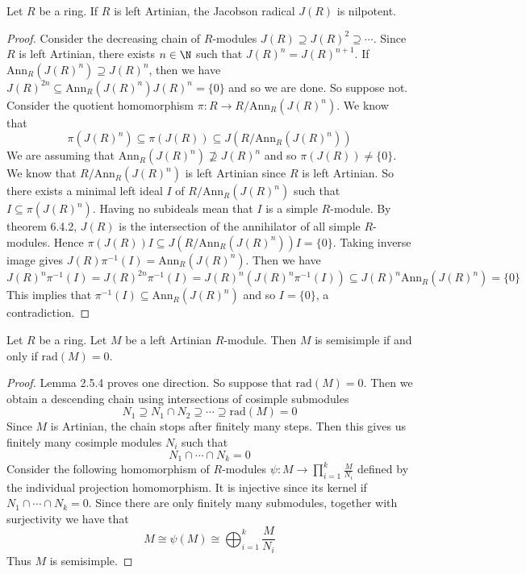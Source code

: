 \documentclass[a4paper]{article}
\begin{document}
\begin{prp}{}{} Let $R$ be a ring. If $R$ is left Artinian, the Jacobson radical $J(R)$ is nilpotent. 
\begin{proof}
Consider the decreasing chain of $R$-modules $J(R)\supseteq J(R)^2\supseteq\cdots$. Since $R$ is left Artinian, there exists $n\in\N$ such that $J(R)^n=J(R)^{n+1}$. If $\text{Ann}_R(J(R)^n)\supseteq J(R)^n$, then we have $J(R)^{2n}\subseteq\text{Ann}_R(J(R)^n)J(R)^n=\{0\}$ and so we are done. So suppose not. Consider the quotient homomorphism $\pi:R\to R/\text{Ann}_R(J(R)^n)$. We know that $$\pi(J(R)^n)\subseteq\pi(J(R))\subseteq J(R/\text{Ann}_R(J(R)^n))$$ We are assuming that $\text{Ann}_R(J(R)^n)\not\supseteq J(R)^n$ and so $\pi(J(R))\neq\{0\}$. We know that $R/\text{Ann}_R(J(R)^n)$ is left Artinian since $R$ is left Artinian. So there exists a minimal left ideal $I$ of $R/\text{Ann}_R(J(R)^n)$ such that $I\subseteq\pi(J(R)^n)$. Having no subideals mean that $I$ is a simple $R$-module. By theorem 6.4.2, $J(R)$ is the intersection of the annihilator of all simple $R$-modules. Hence $\pi(J(R))I\subseteq J(R/\text{Ann}_R(J(R)^n))I=\{0\}$. Taking inverse image gives $J(R)\pi^{-1}(I)=\text{Ann}_R(J(R)^n)$. Then we have $$J(R)^n\pi^{-1}(I)=J(R)^{2n}\pi^{-1}(I)=J(R)^n(J(R)^n\pi^{-1}(I))\subseteq J(R)^n\text{Ann}_R(J(R)^n)=\{0\}$$ This implies that $\pi^{-1}(I)\subseteq\text{Ann}_R(J(R)^n)$ and so $I=\{0\}$, a contradiction. 
\end{proof}
\end{prp}

\begin{prp}{}{} Let $R$ be a ring. Let $M$ be a left Artinian $R$-module. Then $M$ is semisimple if and only if $\text{rad}(M)=0$. 
\begin{proof}
Lemma 2.5.4 proves one direction. So suppose that $\text{rad}(M)=0$. Then we obtain a descending chain using intersections of cosimple submodules $$N_1\supseteq N_1\cap N_2\supseteq\cdots\supseteq\text{rad}(M)=0$$ Since $M$ is Artinian, the chain stops after finitely many steps. Then this gives us finitely many cosimple modules $N_i$ such that $$N_1\cap\cdots\cap N_k=0$$ Consider the following homomorphism of $R$-modules $\psi:M\to\prod_{i=1}^k\frac{M}{N_i}$ defined by the individual projection homomorphism. It is injective since its kernel if $N_1\cap\cdots\cap N_k=0$. Since there are only finitely many submodules, together with surjectivity we have that $$M\cong\psi(M)\cong\bigoplus_{i=1}^k\frac{M}{N_i}$$ Thus $M$ is semisimple. 
\end{proof}
\end{prp}
\end{document}
